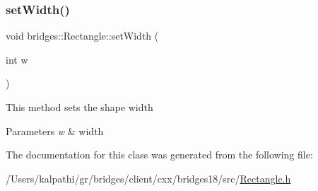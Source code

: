 \mbox{\label{classbridges_1_1_rectangle_ab592c45be7344b4a406d6332b392cb12}} 
\subsubsection{\texorpdfstring{set\+Width()}{setWidth()}}
{\footnotesize\ttfamily void bridges\+::\+Rectangle\+::set\+Width (\begin{DoxyParamCaption}\item[{int}]{w }\end{DoxyParamCaption})\hspace{0.3cm}{\ttfamily [inline]}}

This method sets the shape width


\begin{DoxyParams}{Parameters}
{\em w} & width \\
\hline
\end{DoxyParams}


The documentation for this class was generated from the following file\+:\begin{DoxyCompactItemize}
\item 
/\+Users/kalpathi/gr/bridges/client/cxx/bridges18/src/\mbox{\hyperlink{_rectangle_8h}{Rectangle.\+h}}\end{DoxyCompactItemize}
